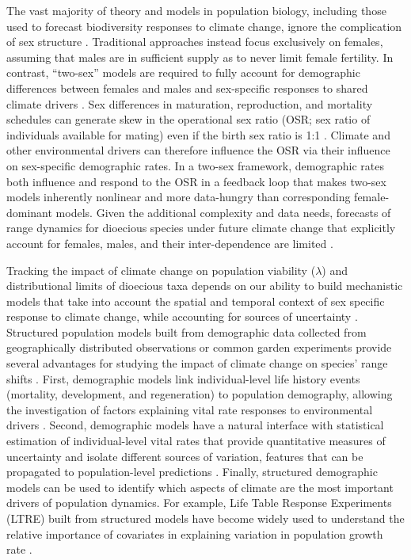 \documentclass[12pt]{article}\usepackage[]{graphicx}\usepackage[dvipsnames]{xcolor}
\begin{document}
The vast majority of theory and models in population biology, including those used to forecast biodiversity responses to climate change, ignore the complication of sex structure \citep[but see][] {pottier2021sexual,ellis2017does,Elena}.
Traditional approaches instead focus exclusively on females, assuming that males are in sufficient supply as to never limit female fertility. 
In contrast, ``two-sex'' models are required to fully account for demographic differences between females and males and sex-specific responses to shared climate drivers \citep{gerber2014two,miller2011sex}. 
Sex differences in maturation, reproduction, and mortality schedules can generate skew in the operational sex ratio (OSR; sex ratio of individuals available for mating) even if the birth sex ratio is 1:1 \citep{eberhart2017sex,shelton2010ecological}. 
Climate and other environmental drivers can therefore influence the OSR via their influence on sex-specific demographic rates. 
In a two-sex framework, demographic rates both influence and respond to the OSR in a feedback loop that makes two-sex models inherently nonlinear and more data-hungry than corresponding female-dominant models. 
Given the additional complexity and data needs, forecasts of range dynamics for dioecious species under future climate change that explicitly account for females, males, and their inter-dependence are limited \citep{petry2016sex,lynch2014climate}.

Tracking the impact of climate change on  population viability ($\lambda$) and distributional limits of dioecious taxa depends on our ability to build mechanistic models that take into account the spatial and temporal context of sex specific response to climate change, while accounting for sources of uncertainty \citep{davis2001range,evans2016towards}.
Structured population models built from demographic data collected from geographically distributed observations or common garden experiments provide several advantages for studying the impact of climate change on species' range shifts \citep{merow2017climate,schwinning2022common,schultz2022climate}.
First, demographic models link individual-level life history events (mortality, development, and regeneration) to population demography, allowing the investigation of factors explaining vital rate responses to environmental drivers \citep{ehrlen2015predicting,louthan2022climate,dahlgren2016demography}. 
Second, demographic models have a natural interface with statistical estimation of individual-level vital rates that provide quantitative measures of uncertainty and isolate different sources of variation, features that can be propagated to population-level predictions \citep{elderd2016quantifying,ellner2022critical}.
Finally, structured demographic models can be used to identify which aspects of climate are the most important drivers of population dynamics.
For example, Life Table Response Experiments (LTRE) built from structured models have become widely used to understand the relative importance of covariates in explaining variation in population growth rate  \citep{ellner2016data,hernandez2023exact,czachura2020demographic}.
\end{document}
